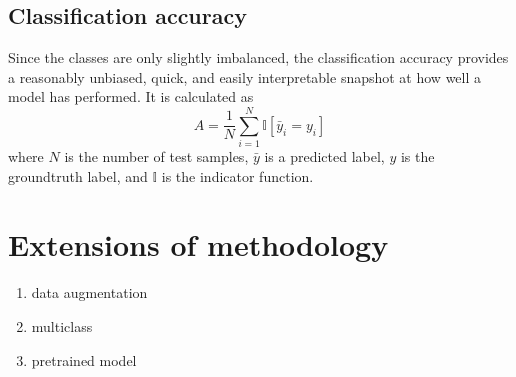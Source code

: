 \subsection{Classification accuracy}

Since the classes are only slightly imbalanced, the classification accuracy
provides a reasonably unbiased, quick, and easily interpretable snapshot at how
well a model has performed. It is calculated as
\begin{equation}
A = \frac{1}{N}\sum_{i=1}^{N} \mathbb{I}[\bar{y}_i = y_i]
\end{equation}
where $N$ is the number of test samples, $\bar{y}$ is a predicted label, $y$
is the groundtruth label, and $\mathbb{I}$ is the indicator function.

\section{Extensions of methodology}

\begin{enumerate}

  \item data augmentation

  \item multiclass

  \item pretrained model

\end{enumerate}
